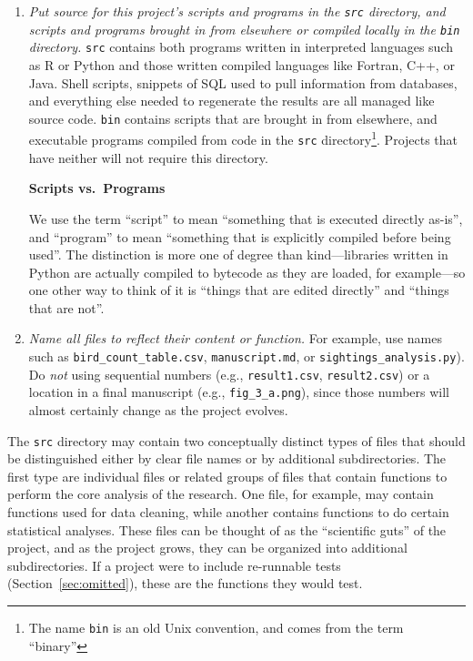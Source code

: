 \documentclass[10pt]{article}
\newcommand{\recommend}[1]{\textit{#1}}
\begin{document}
\begin{enumerate}
\item
  \recommend{Put source for this project's scripts and programs in the
    \texttt{src} directory, and scripts and programs brought in from
    elsewhere or compiled locally in the \texttt{bin} directory.}
  \texttt{src} contains both programs written in interpreted languages
  such as R or Python and those written compiled languages like
  Fortran, C++, or Java. Shell scripts, snippets of SQL used to pull
  information from databases, and everything else needed to regenerate
  the results are all managed like source code.  \texttt{bin} contains
  scripts that are brought in from elsewhere, and executable programs
  compiled from code in the \texttt{src} directory\footnote{The name
    \texttt{bin} is an old Unix convention, and comes from the term
    ``binary''}. Projects that have neither will not require this
  directory.

  \begin{framed}
    \noindent \textbf{Scripts vs.\ Programs}

    We use the term ``script'' to mean ``something that is executed
    directly as-is'', and ``program'' to mean ``something that is
    explicitly compiled before being used''.  The distinction is more
    one of degree than kind---libraries written in Python are actually
    compiled to bytecode as they are loaded, for example---so one
    other way to think of it is ``things that are edited directly''
    and ``things that are not''.
  \end{framed}

\item
  \recommend{Name all files to reflect their content or function.} For
  example, use names such as \texttt{bird\_count\_table.csv},
  \texttt{manuscript.md}, or \texttt{sightings\_analysis.py}).  Do
  \emph{not} using sequential numbers (e.g., \texttt{result1.csv},
  \texttt{result2.csv}) or a location in a final manuscript (e.g.,
  \texttt{fig\_3\_a.png}), since those numbers will almost certainly
  change as the project evolves.
  
\end{enumerate}

The \texttt{src} directory may contain two conceptually distinct types
of files that should be distinguished either by clear file names or by
additional subdirectories. The first type are individual files or
related groups of files that contain functions to perform the core
analysis of the research. One file, for example, may contain functions
used for data cleaning, while another contains functions to do certain
statistical analyses. These files can be thought of as the
``scientific guts'' of the project, and as the project grows, they can
be organized into additional subdirectories. If a project were to
include re-runnable tests (Section~\ref{sec:omitted}), these are the
functions they would test.
  
\end{document}
